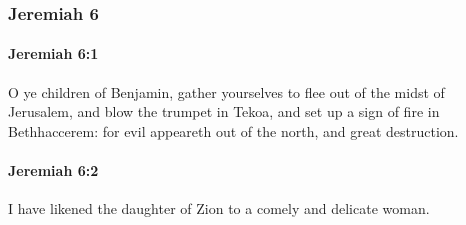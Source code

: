 	\subsubsection{Jeremiah 6} %
		\label{JEREMIAH-6}

		\paragraph{Jeremiah 6:1} %
			\label{JEREMIAH-6-1}

			O ye children of Benjamin, gather yourselves to flee out of the midst of Jerusalem, and blow the trumpet in Tekoa, and set up a sign of fire in Bethhaccerem: for evil appeareth out of the north, and great destruction.


		\paragraph{Jeremiah 6:2} %
			\label{JEREMIAH-6-2}

			I have likened the daughter of Zion to a comely and delicate woman.


